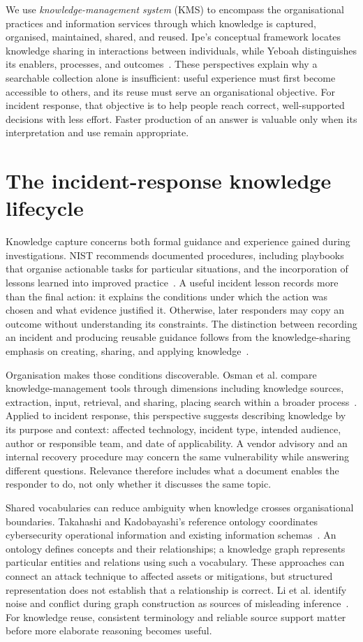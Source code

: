 We use \emph{knowledge-management system} (KMS) to encompass the organisational practices and information services through which knowledge is captured, organised, maintained, shared, and reused. Ipe's conceptual framework locates knowledge sharing in interactions between individuals, while Yeboah distinguishes its enablers, processes, and outcomes~\cite{ref095,ref093}. These perspectives explain why a searchable collection alone is insufficient: useful experience must first become accessible to others, and its reuse must serve an organisational objective. For incident response, that objective is to help people reach correct, well-supported decisions with less effort. Faster production of an answer is valuable only when its interpretation and use remain appropriate.

\section{The incident-response knowledge lifecycle}
Knowledge capture concerns both formal guidance and experience gained during investigations. NIST recommends documented procedures, including playbooks that organise actionable tasks for particular situations, and the incorporation of lessons learned into improved practice~\cite{nist2025incident}. A useful incident lesson records more than the final action: it explains the conditions under which the action was chosen and what evidence justified it. Otherwise, later responders may copy an outcome without understanding its constraints. The distinction between recording an incident and producing reusable guidance follows from the knowledge-sharing emphasis on creating, sharing, and applying knowledge~\cite{ref095}.

Organisation makes those conditions discoverable. Osman et al. compare knowledge-management tools through dimensions including knowledge sources, extraction, input, retrieval, and sharing, placing search within a broader process~\cite{ref094}. Applied to incident response, this perspective suggests describing knowledge by its purpose and context: affected technology, incident type, intended audience, author or responsible team, and date of applicability. A vendor advisory and an internal recovery procedure may concern the same vulnerability while answering different questions. Relevance therefore includes what a document enables the responder to do, not only whether it discusses the same topic.

Shared vocabularies can reduce ambiguity when knowledge crosses organisational boundaries. Takahashi and Kadobayashi's reference ontology coordinates cybersecurity operational information and existing information schemas~\cite{ref074}. An ontology defines concepts and their relationships; a knowledge graph represents particular entities and relations using such a vocabulary. These approaches can connect an attack technique to affected assets or mitigations, but structured representation does not establish that a relationship is correct. Li et al. identify noise and conflict during graph construction as sources of misleading inference~\cite{ref076}. For knowledge reuse, consistent terminology and reliable source support matter before more elaborate reasoning becomes useful.

